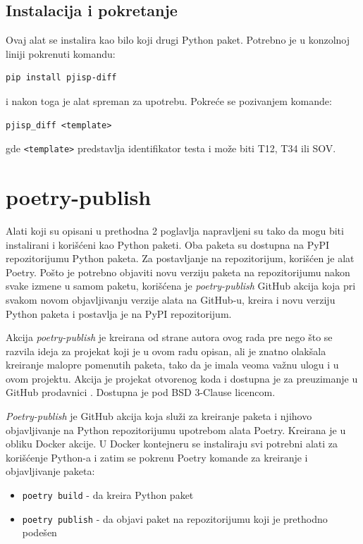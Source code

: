 \documentclass[12pt]{report}
\begin{document}
\subsection{Instalacija i pokretanje}
Ovaj alat se instalira kao bilo koji drugi Python paket. Potrebno je u konzolnoj liniji pokrenuti komandu:

\begin{verbatim}
pip install pjisp-diff
\end{verbatim}

i nakon toga je alat spreman za upotrebu. Pokreće se pozivanjem komande:

\begin{verbatim}
pjisp_diff <template>
\end{verbatim}

gde \texttt{<template>} predstavlja identifikator testa i može biti T12, T34 ili SOV.

\section{poetry-publish}
Alati koji su opisani u prethodna 2 poglavlja napravljeni su tako da mogu biti instalirani i korišćeni kao Python paketi. Oba paketa su dostupna na PyPI repozitorijumu Python paketa. Za postavljanje na repozitorijum, korišćen je alat Poetry. Pošto je potrebno objaviti novu verziju paketa na repozitorijumu nakon svake izmene u samom paketu, korišćena je \textit{poetry-publish} \cite{poetry-publish-repo} GitHub akcija koja pri svakom novom objavljivanju verzije alata na GitHub-u, kreira i novu verziju Python paketa i postavlja je na PyPI repozitorijum.

Akcija \textit{poetry-publish} je kreirana od strane autora ovog rada pre nego što se razvila ideja za projekat koji je u ovom radu opisan, ali je znatno olakšala kreiranje malopre pomenutih paketa, tako da je imala veoma važnu ulogu i u ovom projektu. Akcija je projekat otvorenog koda i dostupna je za preuzimanje u GitHub prodavnici \cite{poetry-publish-marketplace}. Dostupna je pod BSD 3-Clause licencom.

\textit{Poetry-publish} je GitHub akcija koja služi za kreiranje paketa i njihovo objavljivanje na Python repozitorijumu upotrebom alata Poetry. Kreirana je u obliku Docker akcije. U Docker kontejneru se instaliraju svi potrebni alati za korišćenje Python-a i zatim se pokrenu Poetry komande za kreiranje i objavljivanje paketa:

\begin{itemize}
    \item \texttt{poetry build} - da kreira Python paket
    \item \texttt{poetry publish} - da objavi paket na repozitorijumu koji je prethodno podešen
\end{itemize}
\end{document}
